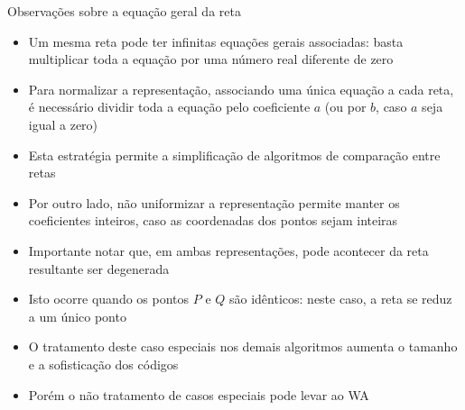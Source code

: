 \begin{frame}[fragile]{Observações sobre a equação geral da reta}

    \begin{itemize}
        \item Um mesma reta pode ter infinitas equações gerais associadas: basta multiplicar toda a equação por uma número real diferente de zero

        \item Para normalizar a representação, associando uma única equação a cada reta, é necessário dividir toda a equação pelo coeficiente $a$ (ou por $b$, caso $a$ seja igual a zero)

        \item Esta estratégia permite a simplificação de algoritmos de comparação entre retas

        \item Por outro lado, não uniformizar a representação permite manter os coeficientes 
            inteiros, caso as coordenadas dos pontos sejam inteiras

        \item Importante notar que, em ambas representações, pode acontecer da reta resultante ser degenerada

        \item Isto ocorre quando os pontos $P$ e $Q$ são idênticos: neste caso, a reta se reduz a um único ponto 

        \item O tratamento deste caso especiais nos demais algoritmos aumenta o tamanho e a sofisticação dos códigos

        \item Porém o não tratamento de casos especiais pode levar ao WA
    \end{itemize}

\end{frame}
